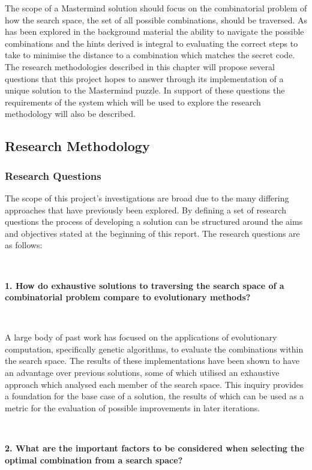 \documentclass[12pt]{article}  %
\theoremstyle{definition}
\theoremstyle{remark}
\begin{document}
The scope of a Mastermind solution should focus on the combinatorial problem of how the search space, the set of all possible combinations, should be traversed. As has been explored in the background material the ability to navigate the possible combinations and the hints derived is integral to evaluating the correct steps to take to minimise the distance to a combination which matches the secret code. The research methodologies described in this chapter will propose several questions that this project hopes to answer through its implementation of a unique solution to the Mastermind puzzle. In support of these questions the requirements of the system which will be used to explore the research methodology will also be described.

\subsection {Research Methodology}

\subsubsection {Research Questions}

The scope of this project's investigations are broad due to the many differing approaches that have previously been explored. By defining a set of research questions the process of developing a solution can be structured around the aims and objectives stated at the beginning of this report. The research questions are as follows:

\

\textbf{1. How do exhaustive solutions to traversing the search space of a combinatorial problem compare to evolutionary methods?}

\

A large body of past work has focused on the applications of evolutionary computation, specifically genetic algorithms, to evaluate the combinations within the search space. The results of these implementations have been shown to have an advantage over previous solutions, some of which utilised an exhaustive approach which analysed each member of the search space. This inquiry provides a foundation for the base case of a solution, the results of which can be used as a metric for the evaluation of possible improvements in later iterations.

\

\textbf{2. What are the important factors to be considered when selecting the optimal combination from a search space?}
\end{document}
